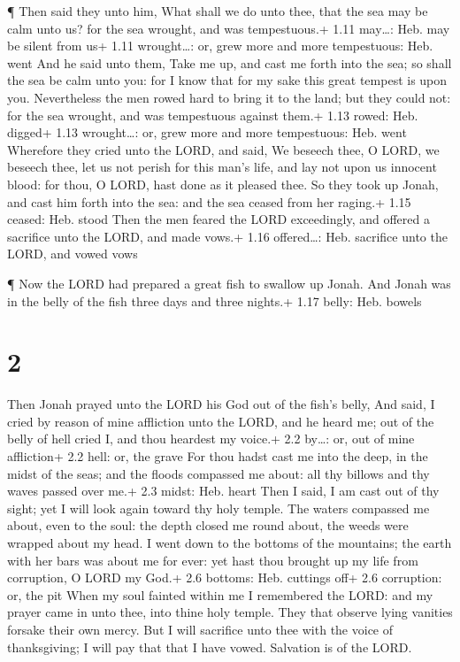  ¶ Then said they unto him, What shall we do unto thee,
that the sea may be calm unto us? for the sea wrought, and was
tempestuous.+ 1.11 may\ldots: Heb. may be silent from us+ 1.11
wrought\ldots: or, grew more and more tempestuous: Heb. went
 And he said unto them, Take me up, and cast me forth into
the sea; so shall the sea be calm unto you: for I know that for my sake
this great tempest is upon you.  Nevertheless the men rowed
hard to bring it to the land; but they could not: for the sea wrought,
and was tempestuous against them.+ 1.13 rowed: Heb. digged+ 1.13
wrought\ldots: or, grew more and more tempestuous: Heb. went
 Wherefore they cried unto the LORD, and said, We beseech
thee, O LORD, we beseech thee, let us not perish for this man's life,
and lay not upon us innocent blood: for thou, O LORD, hast done as it
pleased thee.  So they took up Jonah, and cast him forth
into the sea: and the sea ceased from her raging.+ 1.15 ceased: Heb.
stood  Then the men feared the LORD exceedingly, and
offered a sacrifice unto the LORD, and made vows.+ 1.16 offered\ldots:
Heb. sacrifice unto the LORD, and vowed vows

 ¶ Now the LORD had prepared a great fish to swallow up
Jonah. And Jonah was in the belly of the fish three days and three
nights.+ 1.17 belly: Heb. bowels

\hypertarget{section-1}{%
\section{2}\label{section-1}}

 Then Jonah prayed unto the LORD his God out of the fish's
belly,  And said, I cried by reason of mine affliction unto
the LORD, and he heard me; out of the belly of hell cried I, and thou
heardest my voice.+ 2.2 by\ldots: or, out of mine affliction+ 2.2 hell:
or, the grave  For thou hadst cast me into the deep, in the
midst of the seas; and the floods compassed me about: all thy billows
and thy waves passed over me.+ 2.3 midst: Heb. heart  Then I
said, I am cast out of thy sight; yet I will look again toward thy holy
temple.  The waters compassed me about, even to the soul:
the depth closed me round about, the weeds were wrapped about my head.
 I went down to the bottoms of the mountains; the earth with
her bars was about me for ever: yet hast thou brought up my life from
corruption, O LORD my God.+ 2.6 bottoms: Heb. cuttings off+ 2.6
corruption: or, the pit  When my soul fainted within me I
remembered the LORD: and my prayer came in unto thee, into thine holy
temple.  They that observe lying vanities forsake their own
mercy.  But I will sacrifice unto thee with the voice of
thanksgiving; I will pay that that I have vowed. Salvation is of the
LORD.

